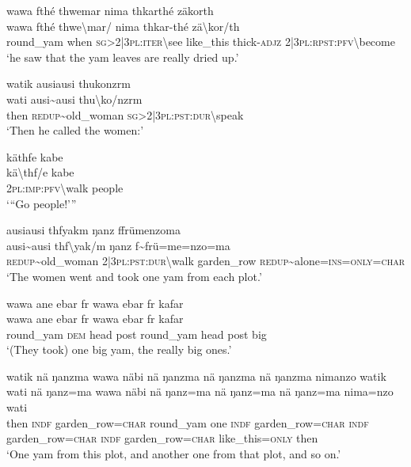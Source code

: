 \ea\label{ex:1:a3795}
wawa fthé thwemar nima thkarthé zäkorth\\
\gll wawa	fthé	thwe{\textbackslash}mar/	nima	thkar-thé	zä{\textbackslash}kor/th\\
     round\_yam	when	\textsc{sg}>2|3\textsc{pl}:\textsc{iter}{\textbackslash}see	like\_this	thick-\textsc{adjz}	2|3\textsc{pl}:\textsc{rpst}:\textsc{pfv}{\textbackslash}become\\
\glt `he saw that the yam leaves are really dried up.'
\z

\ea\label{ex:1:a3796}
watik ausiausi thukonzrm\\
\gll wati	ausi{\textasciitilde}ausi	thu{\textbackslash}ko/nzrm\\
     then	\textsc{redup}{\textasciitilde}old\_woman	\textsc{sg}>2|3\textsc{pl}:\textsc{pst}:\textsc{dur}{\textbackslash}speak\\
\glt `Then he called the women:'
\z

\ea\label{ex:1:a3798}
käthfe kabe\\
\gll kä{\textbackslash}thf/e	kabe\\
     2\textsc{pl}:\textsc{imp}:\textsc{pfv}{\textbackslash}walk	people\\
\glt `{``}Go people!'''
\z

\ea\label{ex:1:a3799}
ausiausi thfyakm ŋanz ffrümenzoma\\
\gll ausi{\textasciitilde}ausi	thf{\textbackslash}yak/m	ŋanz	f{\textasciitilde}frü=me=nzo=ma\\
     \textsc{redup}{\textasciitilde}old\_woman	2|3\textsc{pl}:\textsc{pst}:\textsc{dur}{\textbackslash}walk	garden\_row	\textsc{redup}{\textasciitilde}alone=\textsc{ins}=\textsc{only}=\textsc{char}\\
\glt `The women went and took one yam from each plot.'
\z

\ea\label{ex:1:a3801}
wawa ane ebar fr wawa ebar fr kafar\\
\gll wawa	ane	ebar	fr	wawa	ebar	fr	kafar\\
     round\_yam	\textsc{dem}	head	post	round\_yam	head	post	big\\
\glt `(They took) one big yam, the really big ones.'
\z

\ea\label{ex:1:a3803}
watik nä ŋanzma wawa näbi nä ŋanzma nä ŋanzma nä ŋanzma nimanzo watik\\
\gll wati	nä	ŋanz=ma	wawa	näbi	nä	ŋanz=ma	nä	ŋanz=ma	nä	ŋanz=ma	nima=nzo	wati\\
     then	\textsc{indf}	garden\_row=\textsc{char}	round\_yam	one	\textsc{indf}	garden\_row=\textsc{char}	\textsc{indf}	garden\_row=\textsc{char}	\textsc{indf}	garden\_row=\textsc{char}	like\_this=\textsc{only}	then\\
\glt `One yam from this plot, and another one from that plot, and so on.'
\z

